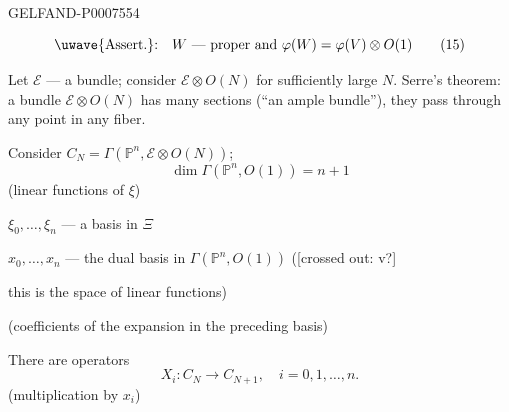 \begin{GelfandAdjacentEvidence}{GELFAND-P000755}{4}


\begin{equation*}
\text{\uwave{Assert.}:}\quad
W\text{ --- proper and }\varphi(W)=\varphi(V)\otimes O(1)
\tag{15}
\end{equation*}

Let \(\mathcal E\) --- a bundle;
consider \(\mathcal E\otimes O(N)\) for sufficiently large \(N\).
Serre's theorem:
a bundle \(\mathcal E\otimes O(N)\) has many sections
(“an ample bundle”), they pass through any point in any fiber.

Consider \(C_N=\Gamma(\mathbb P^n,\mathcal E\otimes O(N))\);
\begin{equation*}
\dim\Gamma(\mathbb P^n,O(1))=n+1
\tag{16}
\end{equation*}
(linear functions of \(\xi\))

\(\xi_0,\ldots,\xi_n\) --- a basis in \(\Xi\)

\(x_0,\ldots,x_n\) --- the dual basis in \(\Gamma(\mathbb P^n,O(1))\)
([crossed out: v?]
\end{GelfandAdjacentEvidence}

this is the space of linear functions)

(coefficients of the expansion in the preceding basis)

There are operators
\begin{equation*}
X_i:C_N\longrightarrow C_{N+1},\quad i=0,1,\ldots,n.
\tag{17}
\end{equation*}
(multiplication by \(x_i\))


